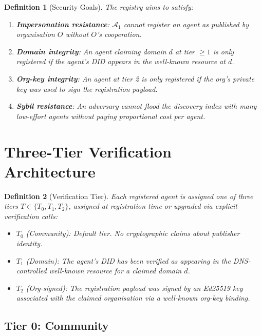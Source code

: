 \documentclass[conference]{IEEEtran}
\newtheorem{definition}{Definition}
\newcommand{\Adv}{\mathcal{A}}
\begin{document}
\begin{definition}[Security Goals]
The registry aims to satisfy:
\begin{enumerate}
  \item \textbf{Impersonation resistance}: $\Adv_1$ cannot
    register an agent as published by organisation $O$
    without $O$'s cooperation.
  \item \textbf{Domain integrity}: An agent claiming
    domain $d$ at tier $\geq 1$ is only registered if the
    agent's DID appears in the well-known resource at $d$.
  \item \textbf{Org-key integrity}: An agent at tier 2
    is only registered if the org's private key was used
    to sign the registration payload.
  \item \textbf{Sybil resistance}: An adversary cannot
    flood the discovery index with many low-effort agents
    without paying proportional cost per agent.
\end{enumerate}
\end{definition}

\section{Three-Tier Verification Architecture}
\label{sec:tiers}

\begin{definition}[Verification Tier]
Each registered agent is assigned one of three tiers
$T \in \{T_0, T_1, T_2\}$, assigned at registration time
or upgraded via explicit verification calls:
\begin{itemize}
  \item $T_0$ (Community): Default tier. No cryptographic
    claims about publisher identity.
  \item $T_1$ (Domain): The agent's DID has been verified
    as appearing in the DNS-controlled well-known resource
    for a claimed domain $d$.
  \item $T_2$ (Org-signed): The registration payload was
    signed by an Ed25519 key associated with the claimed
    organisation via a well-known org-key binding.
\end{itemize}
\end{definition}

\subsection{Tier 0: Community}
\end{document}
